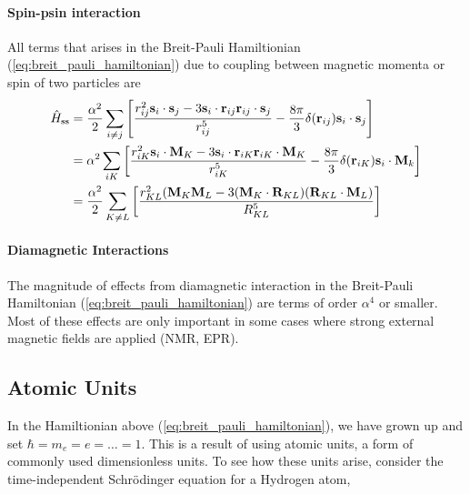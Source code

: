     \paragraph{Spin-psin interaction}
    All terms that arises in the Breit-Pauli Hamiltionian (\autoref{eq:breit_pauli_hamiltonian}) due to 
    coupling between magnetic momenta or spin of two particles are
    \begin{equation}
        \begin{aligned}
            \hat{H}_{\text{ss}}
                &= \frac{\alpha^2}{2} \sum_{i \neq j}
                \left[ 
                    \frac{r^2_{ij}\vb{s}_i \cdot \vb{s}_j - 3\vb{s}_i \cdot \vb{r}_{ij}\vb{r}_{ij} \cdot \vb{s}_j}
                            {r^5_{ij}}
                    - \frac{8\pi}{3} \delta(\vb{r}_{ij}) \vb{s}_i \cdot \vb{s}_j
                \right] \\
                &= \alpha^2 \sum_{iK}
                \left[ 
                    \frac{r^2_{iK}\vb{s}_i \cdot \vb{M}_K - 3\vb{s}_i \cdot \vb{r}_{iK}\vb{r}_{iK} \cdot \vb{M}_K}
                            {r^5_{iK}}
                    - \frac{8\pi}{3} \delta(\vb{r}_{iK}) \vb{s}_i \cdot \vb{M}_k
                \right] \\
                &= \frac{\alpha^2}{2} \sum_{K \neq L}
                \left[ 
                    \frac{r^2_{KL} (\vb{M}_K \vb{M}_L - 3(\vb{M}_K \cdot \vb{R}_{KL}) (\vb{R}_{KL} \cdot \vb{M}_L)}
                            {R^5_{KL}}
                \right]
        \end{aligned}
    \end{equation}

    \paragraph{Diamagnetic Interactions}
    The magnitude of effects from diamagnetic interaction in the Breit-Pauli Hamiltonian 
    (\autoref{eq:breit_pauli_hamiltonian}) are terms of order $\alpha^4$ or smaller.
    Most of these effects are only important in some cases where strong external magnetic
    fields are applied (NMR, EPR).

    \subsection{Atomic Units}

        In the Hamiltionian above (\autoref{eq:breit_pauli_hamiltonian}), we have grown up
        and set $\hbar = m_e = e = \dots = 1$. This is a result of using atomic units, a
        form of commonly used dimensionless units. To see how these units arise, consider
        the time-independent Schrödinger equation for a Hydrogen atom,

